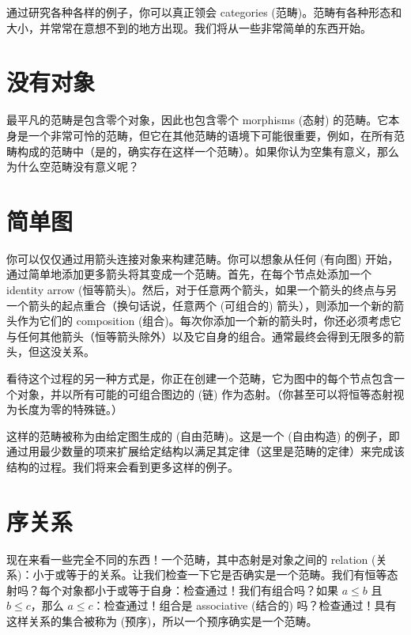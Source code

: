 
\lettrine[lhang=0.17]{通}{过研究各种各样的例子}，你可以真正领会 categories (范畴)。范畴有各种形态和大小，并常常在意想不到的地方出现。我们将从一些非常简单的东西开始。

\section{没有对象}

最平凡的范畴是包含零个对象，因此也包含零个 morphisms (态射) 的范畴。它本身是一个非常可怜的范畴，但它在其他范畴的语境下可能很重要，例如，在所有范畴构成的范畴中（是的，确实存在这样一个范畴）。如果你认为空集有意义，那么为什么空范畴没有意义呢？

\section{简单图}

你可以仅仅通过用箭头连接对象来构建范畴。你可以想象从任何  (有向图) 开始，通过简单地添加更多箭头将其变成一个范畴。首先，在每个节点处添加一个 identity arrow (恒等箭头)。然后，对于任意两个箭头，如果一个箭头的终点与另一个箭头的起点重合（换句话说，任意两个  (可组合的) 箭头），则添加一个新的箭头作为它们的 composition (组合)。每次你添加一个新的箭头时，你还必须考虑它与任何其他箭头（恒等箭头除外）以及它自身的组合。通常最终会得到无限多的箭头，但这没关系。

看待这个过程的另一种方式是，你正在创建一个范畴，它为图中的每个节点包含一个对象，并以所有可能的可组合图边的  (链) 作为态射。（你甚至可以将恒等态射视为长度为零的特殊链。）

这样的范畴被称为由给定图生成的  (自由范畴)。这是一个  (自由构造) 的例子，即通过用最少数量的项来扩展给定结构以满足其定律（这里是范畴的定律）来完成该结构的过程。我们将来会看到更多这样的例子。

\section{序关系}

现在来看一些完全不同的东西！一个范畴，其中态射是对象之间的 relation (关系)：小于或等于的关系。让我们检查一下它是否确实是一个范畴。我们有恒等态射吗？每个对象都小于或等于自身：检查通过！我们有组合吗？如果 $a \leqslant b$ 且 $b \leqslant c$，那么 $a \leqslant c$：检查通过！组合是 associative (结合的) 吗？检查通过！具有这样关系的集合被称为  (预序)，所以一个预序确实是一个范畴。

